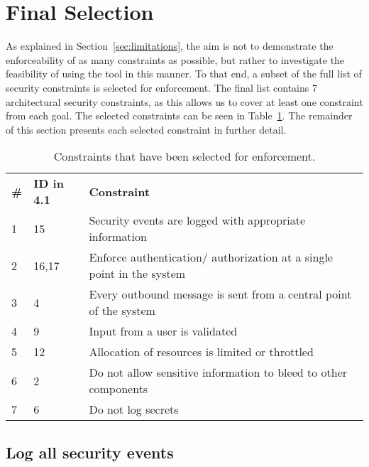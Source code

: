 \section{Final Selection}

As explained in Section~\ref{sec:limitations}, the aim is not to demonstrate the enforceability of as many constraints as possible, but rather to investigate the feasibility of using the tool in this manner. To that end, a subset of the full list of security constraints is selected for enforcement. The final list contains 7 architectural security constraints, as this allows us to cover at least one constraint from each goal. The selected constraints can be seen in Table~\ref{tab:selected_measures}. The remainder of this section presents each selected constraint in further detail.

\begin{table}
\begin{tabular}{llp{11cm}}
\hline
\textbf{\#} & \textbf{ID in 4.1} & \textbf{Constraint} \\
1 & 15 & Security events are logged with appropriate information\\
\rowcolor{RowColor}
2 & 16,17 & Enforce authentication/ authorization at a single point in the system\\
3 & 4 & Every outbound message is sent from a central point of the system\\
\rowcolor{RowColor}
4 & 9 & Input from a user is validated\\
5 & 12 & Allocation of resources is limited or throttled\\
\rowcolor{RowColor}
6 & 2 & Do not allow sensitive information to bleed to other components\\
7 & 6 & Do not log secrets\\
\hline
\end{tabular}
\caption{Constraints that have been selected for enforcement.}
\label{tab:selected_measures}
\end{table}


\subsection{Log all security events}

